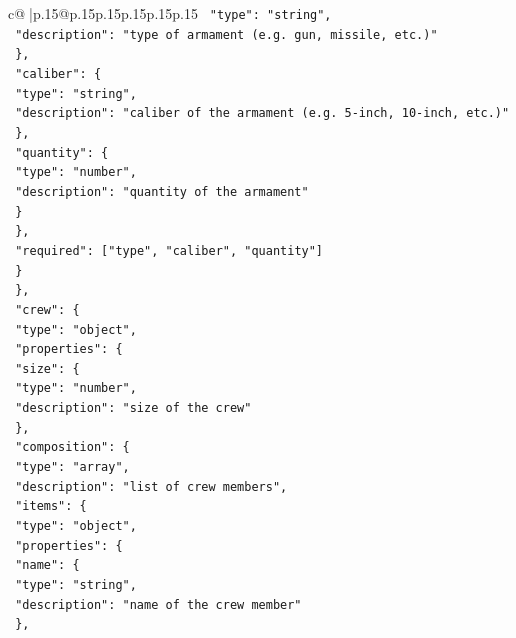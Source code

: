 \documentclass{article}
\begin{document}
{\begin{supertabular}{c@{$\;$}|p{.15\linewidth}@{}p{.15\linewidth}p{.15\linewidth}p{.15\linewidth}p{.15\linewidth}p{.15\linewidth}}
{{{\texttt{            "type": "string",} \\
\texttt{            "description": "type of armament (e.g. gun, missile, etc.)"} \\
\texttt{          \},} \\
\texttt{          "caliber": \{} \\
\texttt{            "type": "string",} \\
\texttt{            "description": "caliber of the armament (e.g. 5{-}inch, 10{-}inch, etc.)"} \\
\texttt{          \},} \\
\texttt{          "quantity": \{} \\
\texttt{            "type": "number",} \\
\texttt{            "description": "quantity of the armament"} \\
\texttt{          \}} \\
\texttt{        \},} \\
\texttt{        "required": {[}"type", "caliber", "quantity"{]}} \\
\texttt{      \}} \\
\texttt{    \},} \\
\texttt{    "crew": \{} \\
\texttt{      "type": "object",} \\
\texttt{      "properties": \{} \\
\texttt{        "size": \{} \\
\texttt{          "type": "number",} \\
\texttt{          "description": "size of the crew"} \\
\texttt{        \},} \\
\texttt{        "composition": \{} \\
\texttt{          "type": "array",} \\
\texttt{          "description": "list of crew members",} \\
\texttt{          "items": \{} \\
\texttt{            "type": "object",} \\
\texttt{            "properties": \{} \\
\texttt{              "name": \{} \\
\texttt{                "type": "string",} \\
\texttt{                "description": "name of the crew member"} \\
\texttt{              \},} \\
}}}
\end{supertabular}}
\end{document}
